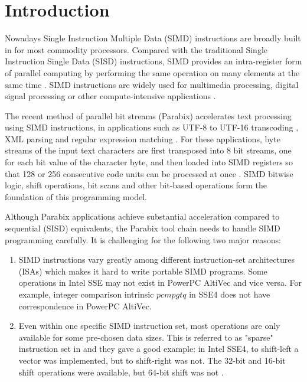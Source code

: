 %
%

\chapter{Introduction}
\label{one}

Nowadays Single Instruction Multiple Data (SIMD) instructions are broadly built in for most commodity processors. Compared with the traditional Single Instruction Single Data (SISD) instructions, SIMD provides an intra-register form of parallel computing by performing the same operation on many elements at the same time \cite{Fisher_phd}. SIMD instructions are widely used for multimedia processing, digital signal processing or other compute-intensive applications \cite{multimedia_simd, dsp_simd}.

The recent method of parallel bit streams (Parabix) accelerates text processing using SIMD instructions, in applications such as UTF-8 to UTF-16 transcoding \cite{rob_u8u16, rob_u8u16_techreport}, XML parsing \cite{medforth_icxml, rob_xml} and regular expression matching \cite{rob_regex}. For these applications, byte streams of the input text characters are first transposed into 8 bit streams, one for each bit value of the character byte, and then loaded into SIMD registers so that 128 or 256 consecutive code units can be processed at once \cite{inductive_doubling_principle}. SIMD bitwise logic, shift operations, bit scans and other bit-based operations form the foundation of this programming model.

Although Parabix applications achieve substantial acceleration compared to sequential (SISD) equivalents, the Parabix tool chain needs to handle SIMD programming carefully. It is challenging for the following two major reasons:

\begin{enumerate}
  \item SIMD instructions vary greatly among different instruction-set architectures (ISAs) which makes it hard to write portable SIMD programs. Some operations in Intel SSE may not exist in PowerPC AltiVec and vice versa. For example, integer comparison intrinsic $pcmpgtq$ in SSE4 does not have correspondence in PowerPC AltiVec.
  \item Even within one specific SIMD instruction set, most operations are only available for some pre-chosen data sizes. This is referred to as "sparse" instruction set in \cite{hybrid_simd_type_legalize} and they gave a good example: in Intel SSE4, to shift-left a vector was implemented, but to shift-right was not. The 32-bit and 16-bit shift operations were available, but 64-bit shift was not \cite{hybrid_simd_type_legalize}.
\end{enumerate}

